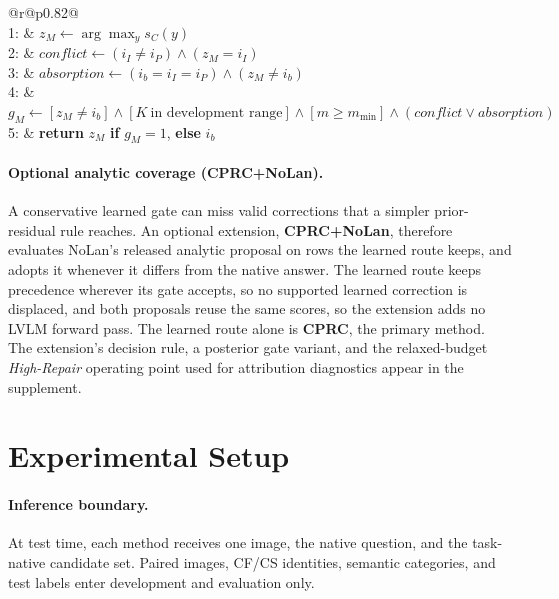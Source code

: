 \documentclass[letterpaper]{article}
\begin{document}
\begin{algorithm}[t]
\caption{Selective Support Gate (learned route).}
\label{alg:gate}
{\footnotesize
\begin{tabular}{@{}r@{\enskip}p{}@{}}
\\[3pt]
1: & $z_M \gets \arg\max_y s_C(y)$\\
2: & $\mathit{conflict} \gets (i_I \ne i_P) \land (z_M = i_I)$\\
3: & $\mathit{absorption} \gets (i_b = i_I = i_P) \land (z_M \ne i_b)$\\
4: & $g_M \gets [z_M \ne i_b] \land [K\ \textrm{in development range}]
\land [m \ge m_{\min}] \land (\mathit{conflict} \lor \mathit{absorption})$\\
5: & \textbf{return} $z_M$ \textbf{if} $g_M=1$, \textbf{else} $i_b$\\
\end{tabular}}
\end{algorithm}

\paragraph{Optional analytic coverage (CPRC+NoLan).}
A conservative learned gate can miss valid corrections that a simpler
prior-residual rule reaches. An optional extension, \textbf{CPRC+NoLan},
therefore evaluates NoLan's released analytic proposal on rows the learned
route keeps, and adopts it whenever it differs from the native answer. The
learned route keeps precedence wherever its gate accepts, so no supported
learned correction is displaced, and both proposals reuse the same scores, so
the extension adds no LVLM forward pass. The learned route alone is
\textbf{CPRC}, the primary method. The extension's decision rule, a posterior
gate variant, and the relaxed-budget \emph{High-Repair} operating point used
for attribution diagnostics appear in the supplement.

\section{Experimental Setup}

\paragraph{Inference boundary.}
At test time, each method receives one image, the native question, and the
task-native candidate set. Paired images, CF/CS identities, semantic
categories, and test labels enter development and evaluation only.
\end{document}
